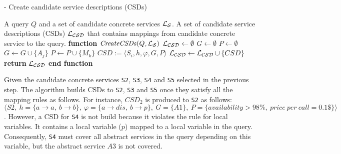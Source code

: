 \begin{algorithm}[h!]
\small
\caption{ - Create candidate service descriptions (CSDs)}
\label{creatingcsds}
\begin{algorithmic}[1]
\REQUIRE A query $Q$ and a set of candidate concrete services $\hbox{${\cal L_{S}}$}$.
\ENSURE A set of candidate service descriptions (CSDs) $\hbox{${\cal L_{CSD}}$}$ that contains mappings from candidate concrete service to the query.
\STATE \textbf{function} $\mathit{CreateCSDs} (Q, \hbox{${\cal L_{S}}$})$
\STATE $\hbox{${\cal L_{CSD}}$} \leftarrow \emptyset$
		\STATE $G \leftarrow \emptyset$	
		\STATE $P \leftarrow \emptyset$		
			\STATE $G \leftarrow G \cup \lbrace A_{j} \rbrace$ 
		\ENDFOR
			\STATE $P \leftarrow P \cup \lbrace M_{k} \rbrace$ 
		\ENDFOR
		\STATE $CSD := \langle S_{i}, h, \varphi, G, P \rangle$	
		\STATE $\hbox{${\cal L_{CSD}}$} \leftarrow \hbox{${\cal L_{CSD}}$} \cup \lbrace CSD \rbrace$	
	\ENDIF
\ENDFOR
\STATE \textbf{return} $\hbox{${\cal L_{CSD}}$}$
\STATE \textbf{end function}
\end{algorithmic}
\end{algorithm}

Given the candidate concrete services \texttt{S2}, \texttt{S3}, \texttt{S4} and \texttt{S5} selected in the previous step. The algorithm builds CSDs to \texttt{S2}, \texttt{S3} and \texttt{S5} once they satisfy all the mapping rules as follows.
For instance, $CSD_{2}$ is produced to \texttt{S2} as follows: 
$\langle S2, \ h = \lbrace a \rightarrow a, \ b \rightarrow b \rbrace, \ \varphi = \lbrace a \rightarrow dis, \ b \rightarrow p \rbrace, \ G = \lbrace A1 \rbrace, \ P = \lbrace availability > 98\%, \ price \ per \ call = 0.1\$ \rbrace \rangle$. However, a CSD for \texttt{S4} is not build because it violates the rule for local variables. It contains a local variable ($p$) mapped to a local variable in the query. Consequently, \texttt{S4} must cover all abstract services in the query depending on this variable, but the abstract service $A3$ is not covered.

 

